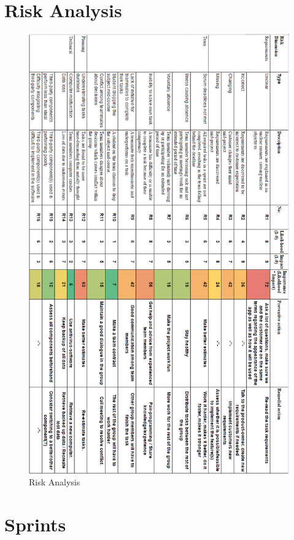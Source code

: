 \appendix
\chapter{Risk Analysis}

\begin{figure}[H]
\centering
\includegraphics[scale=0.50]{Figures/riskMatrixBLA.png}
\caption{Risk Analysis}
\label{fig:RiskFull}
\end{figure}

\chapter{Sprints}
